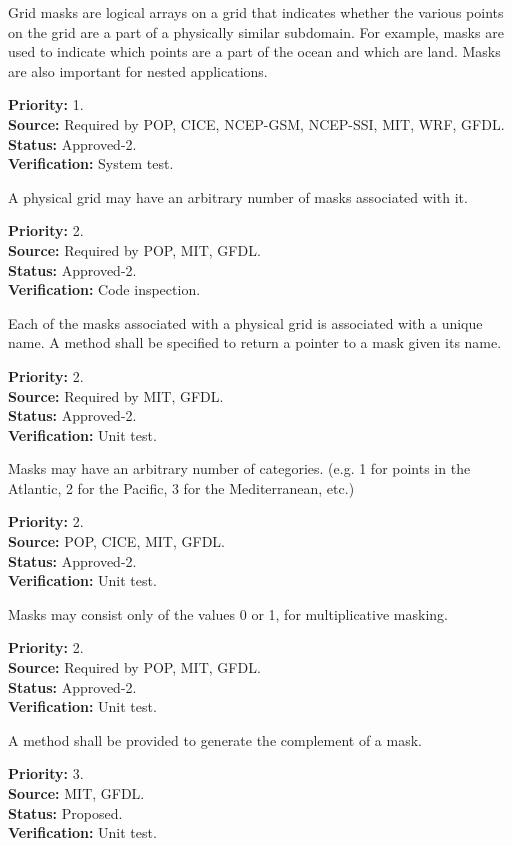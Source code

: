 Grid masks are logical arrays on a grid that indicates whether the various
points on the grid are a part of a physically similar subdomain. For example,
masks are used to indicate which points are a part of the ocean and which are
land.  Masks are also important for nested applications.

\begin{reqlist}
{\bf Priority:} 1. \\
{\bf Source:} Required by POP, CICE, NCEP-GSM, NCEP-SSI, MIT, WRF, GFDL. \\
{\bf Status:} Approved-2. \\
{\bf Verification:} System test.
\end{reqlist}

A physical grid may have an arbitrary number of masks associated with it.
\begin{reqlist}
{\bf Priority:} 2. \\
{\bf Source:} Required by POP, MIT, GFDL. \\
{\bf Status:} Approved-2. \\
{\bf Verification:} Code inspection.
\end{reqlist}

Each of the masks associated with a physical grid is associated with a
unique name.  A method shall be specified to return a pointer to a mask given
its name.
\begin{reqlist}
{\bf Priority:} 2. \\
{\bf Source:} Required by MIT, GFDL. \\
{\bf Status:} Approved-2. \\
{\bf Verification:} Unit test.
\end{reqlist}

Masks may have an arbitrary number of categories. (e.g. 1 for points in the
Atlantic, 2 for the Pacific, 3 for the Mediterranean, etc.)
\begin{reqlist}
{\bf Priority:} 2. \\
{\bf Source:} POP, CICE, MIT, GFDL. \\
{\bf Status:} Approved-2. \\
{\bf Verification:} Unit test.
\end{reqlist}

Masks may consist only of the values 0 or 1, for multiplicative masking.
\begin{reqlist}
{\bf Priority:} 2. \\
{\bf Source:} Required by POP, MIT, GFDL. \\
{\bf Status:} Approved-2. \\
{\bf Verification:} Unit test. 
\end{reqlist}

A method shall be provided to generate the complement of a mask.
\begin{reqlist}
{\bf Priority:} 3. \\
{\bf Source:} MIT, GFDL. \\
{\bf Status:} Proposed. \\
{\bf Verification:} Unit test.
\end{reqlist}



